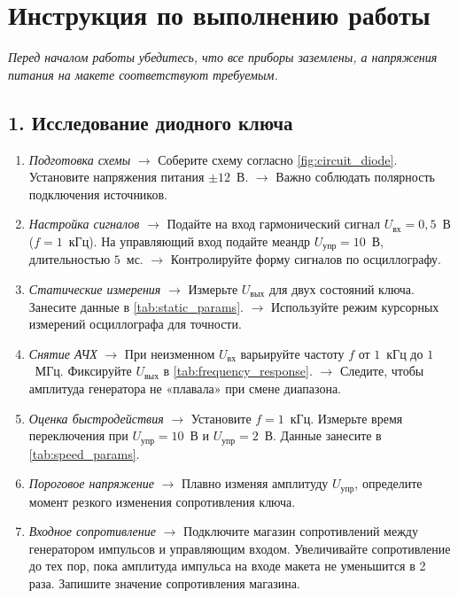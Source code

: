 \section*{Инструкция по выполнению работы}

\textit{Перед началом работы убедитесь, что все приборы заземлены, а напряжения питания на макете соответствуют требуемым.}

\subsection*{1. Исследование диодного ключа}
\begin{enumerate}
    \item \textit{Подготовка схемы} $\rightarrow$ Соберите схему согласно \cref{fig:circuit_diode}. Установите напряжения питания $\pm 12$~В. $\rightarrow$ Важно соблюдать полярность подключения источников.
    \item \textit{Настройка сигналов} $\rightarrow$ Подайте на вход гармонический сигнал $U_{вх} = 0,5$~В ($f = 1$~кГц). На управляющий вход подайте меандр $U_{упр} = 10$~В, длительностью $5$~мс. $\rightarrow$ Контролируйте форму сигналов по осциллографу.
    \item \textit{Статические измерения} $\rightarrow$ Измерьте $U_{вых}$ для двух состояний ключа. Занесите данные в \cref{tab:static_params}. $\rightarrow$ Используйте режим курсорных измерений осциллографа для точности.
    \item \textit{Снятие АЧХ} $\rightarrow$ При неизменном $U_{вх}$ варьируйте частоту $f$ от $1$~кГц до $1$~МГц. Фиксируйте $U_{вых}$ в \cref{tab:frequency_response}. $\rightarrow$ Следите, чтобы амплитуда генератора не «плавала» при смене диапазона.
    \item \textit{Оценка быстродействия} $\rightarrow$ Установите $f = 1$~кГц. Измерьте время переключения при $U_{упр} = 10$~В и $U_{упр} = 2$~В. Данные занесите в \cref{tab:speed_params}.
    \item \textit{Пороговое напряжение} $\rightarrow$ Плавно изменяя амплитуду $U_{упр}$, определите момент резкого изменения сопротивления ключа.
    \item \textit{Входное сопротивление} $\rightarrow$ Подключите магазин сопротивлений между генератором импульсов и управляющим входом. Увеличивайте сопротивление до тех пор, пока амплитуда импульса на входе макета не уменьшится в 2 раза. Запишите значение сопротивления магазина.
\end{enumerate}

